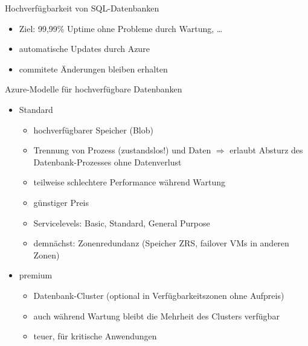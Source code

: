 \begin{flashcard}[]{Hochverfügbarkeit von SQL-Datenbanken}
  \begin{itemize}
    \item Ziel: 99,99\% Uptime ohne Probleme durch Wartung, \ldots
    \item automatische Updates durch Azure
    \item commitete Änderungen bleiben erhalten
  \end{itemize}
\end{flashcard}

\begin{flashcard}[]{Azure-Modelle für hochverfügbare Datenbanken}
  \begin{itemize}
    \item Standard
      \begin{itemize}
        \item hochverfügbarer Speicher (Blob)
        \item Trennung von Prozess (zustandslos!) und Daten\newline
          $\Rightarrow$ erlaubt Absturz des Datenbank-Prozesses ohne Datenverlust
        \item teilweise schlechtere Performance während Wartung
        \item günstiger Preis
        \item Servicelevels: Basic, Standard, General Purpose
        \item demnächst: Zonenredundanz (Speicher ZRS, failover VMs in anderen Zonen)
      \end{itemize}
    \item premium
      \begin{itemize}
        \item Datenbank-Cluster (optional in Verfügbarkeitszonen ohne Aufpreis)
        \item auch während Wartung bleibt die Mehrheit des Clusters verfügbar
        \item teuer, für kritische Anwendungen
      \end{itemize}
  \end{itemize}
\end{flashcard}

